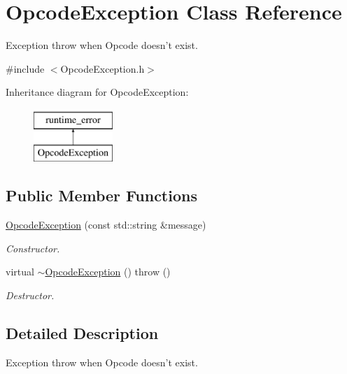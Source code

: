 \hypertarget{class_opcode_exception}{\section{Opcode\-Exception Class Reference}
\label{class_opcode_exception}
}


Exception throw when Opcode doesn't exist.  




{\ttfamily \#include $<$Opcode\-Exception.\-h$>$}

Inheritance diagram for Opcode\-Exception\-:\begin{figure}[H]
\begin{center}
\leavevmode
\includegraphics[height=2.000000cm]{class_opcode_exception}
\end{center}
\end{figure}
\subsection*{Public Member Functions}
\begin{DoxyCompactItemize}
\item 
\hyperlink{class_opcode_exception_a89f29c901bab080836875ecfe4d2218c}{Opcode\-Exception} (const std\-::string \&message)
\begin{DoxyCompactList}\small\item\em Constructor. \end{DoxyCompactList}\item 
\hypertarget{class_opcode_exception_ab5923ba72b7ba43a23cfa810ff64a8d9}{virtual \hyperlink{class_opcode_exception_ab5923ba72b7ba43a23cfa810ff64a8d9}{$\sim$\-Opcode\-Exception} ()  throw ()}\label{class_opcode_exception_ab5923ba72b7ba43a23cfa810ff64a8d9}

\begin{DoxyCompactList}\small\item\em Destructor. \end{DoxyCompactList}\end{DoxyCompactItemize}


\subsection{Detailed Description}
Exception throw when Opcode doesn't exist. 

